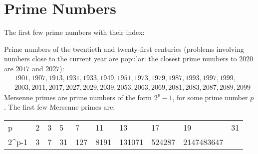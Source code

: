 \documentclass[12pt]{article}
\begin{document}
\newpage

\section*{Prime Numbers}
The first few prime numbers with their index:

\begin{minipage}{\textwidth}
\centering
{}
\end{minipage}

Prime numbers of the twentieth and twenty-first centuries (problems involving numbers close to the current year are popular: the closest prime numbers to $2020$ are $2017$ and $2027$):
\begin{align*}
& 1901, 1907, 1913, 1931, 1933, 1949, 1951, 1973, 1979, 1987, 1993, 1997, 1999, \\ 
& 2003, 2011, 2017, 2027, 2029, 2039, 2053, 2063, 2069, 2081, 2083, 2087, 2089, 2099
\end{align*}
Mersenne primes are prime numbers of the form $2^{p}-1$, for some prime number $p$. The first few Mersenne primes are:
\begin{center}
\begin{tabular}{X|XXXXXXXXX}
p       & 2 & 3 & 5  & 7   & 11   & 13   & 17     & 19     & 31 \\
2^{p}-1 & 3 & 7 & 31 & 127 & 8191 & 131071 & 524287 & 2147483647 \\
\end{tabular}
\end{center}
\end{document}
